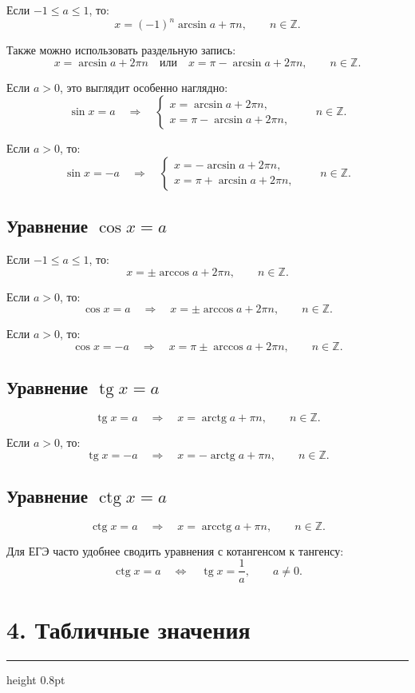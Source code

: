 \documentclass[a4paper,12pt]{article}
\newcommand{\sectionline}{\vspace{0.2em}\textcolor{accent}{\hrule height 0.8pt}\vspace{0.7em}}
\newcommand{\Z}{\mathbb{Z}}
\newcommand{\tg}{\mathop{\mathrm{tg}}\nolimits}
\newcommand{\ctg}{\mathop{\mathrm{ctg}}\nolimits}
\newcommand{\arctg}{\mathop{\mathrm{arctg}}\nolimits}
\newcommand{\arcctg}{\mathop{\mathrm{arcctg}}\nolimits}
\begin{document}
Если \(-1\le a\le 1\), то:
\[
x=(-1)^n\arcsin a+\pi n,\qquad n\in\Z.
\]

Также можно использовать раздельную запись:
\[
x=\arcsin a+2\pi n
\quad \text{или} \quad
x=\pi-\arcsin a+2\pi n,
\qquad n\in\Z.
\]

Если \(a>0\), это выглядит особенно наглядно:
\[
\sin x=a
\quad\Longrightarrow\quad
\begin{cases}
x=\arcsin a+2\pi n,\\
x=\pi-\arcsin a+2\pi n,
\end{cases}
\qquad n\in\Z.
\]

Если \(a>0\), то:
\[
\sin x=-a
\quad\Longrightarrow\quad
\begin{cases}
x=-\arcsin a+2\pi n,\\
x=\pi+\arcsin a+2\pi n,
\end{cases}
\qquad n\in\Z.
\]

\subsection*{Уравнение \(\cos x=a\)}

Если \(-1\le a\le 1\), то:
\[
x=\pm\arccos a+2\pi n,\qquad n\in\Z.
\]

Если \(a>0\), то:
\[
\cos x=a
\quad\Longrightarrow\quad
x=\pm\arccos a+2\pi n,\qquad n\in\Z.
\]

Если \(a>0\), то:
\[
\cos x=-a
\quad\Longrightarrow\quad
x=\pi\pm\arccos a+2\pi n,\qquad n\in\Z.
\]

\subsection*{Уравнение \(\tg x=a\)}

\[
\tg x=a
\quad\Longrightarrow\quad
x=\arctg a+\pi n,\qquad n\in\Z.
\]

Если \(a>0\), то:
\[
\tg x=-a
\quad\Longrightarrow\quad
x=-\arctg a+\pi n,\qquad n\in\Z.
\]

\subsection*{Уравнение \(\ctg x=a\)}

\[
\ctg x=a
\quad\Longrightarrow\quad
x=\arcctg a+\pi n,\qquad n\in\Z.
\]

Для ЕГЭ часто удобнее сводить уравнения с котангенсом к тангенсу:
\[
\ctg x=a
\quad\Longleftrightarrow\quad
\tg x=\frac{1}{a},
\qquad a\ne 0.
\]

\section*{4. Табличные значения}
\sectionline
\end{document}
